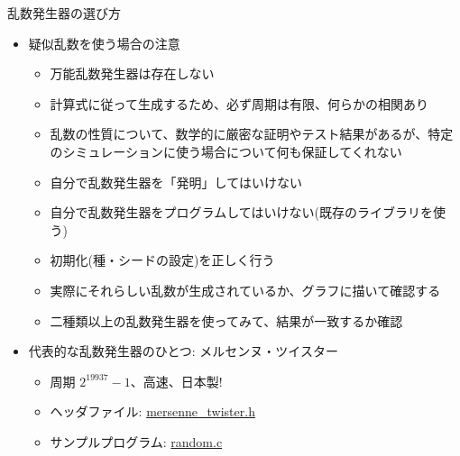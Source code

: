 \begin{frame}[t,fragile]{乱数発生器の選び方}
  \begin{itemize}
  \item 疑似乱数を使う場合の注意
    \begin{itemize}
    \item 万能乱数発生器は存在しない
    \item 計算式に従って生成するため、必ず周期は有限、何らかの相関あり
    \item 乱数の性質について、数学的に厳密な証明やテスト結果があるが、特定のシミュレーションに使う場合について何も保証してくれない
    \item 自分で乱数発生器を「発明」してはいけない
    \item 自分で乱数発生器をプログラムしてはいけない(既存のライブラリを使う)
    \item 初期化(種・シードの設定)を正しく行う
    \item 実際にそれらしい乱数が生成されているか、グラフに描いて確認する
    \item 二種類以上の乱数発生器を使ってみて、結果が一致するか確認
    \end{itemize}
  \item 代表的な乱数発生器のひとつ: メルセンヌ・ツイスター
    \begin{itemize}
    \item 周期 $2^{19937}-1$、高速、日本製!
    \item ヘッダファイル: \href{https://github.com/todo-group/computer-experiments/blob/master/exercise/monte_carlo/mersenne_twister.h}{mersenne\_twister.h}
    \item サンプルプログラム: \href{https://github.com/todo-group/computer-experiments/blob/master/exercise/monte_carlo/random.c}{random.c}
    \end{itemize}
  \end{itemize}
\end{frame}
